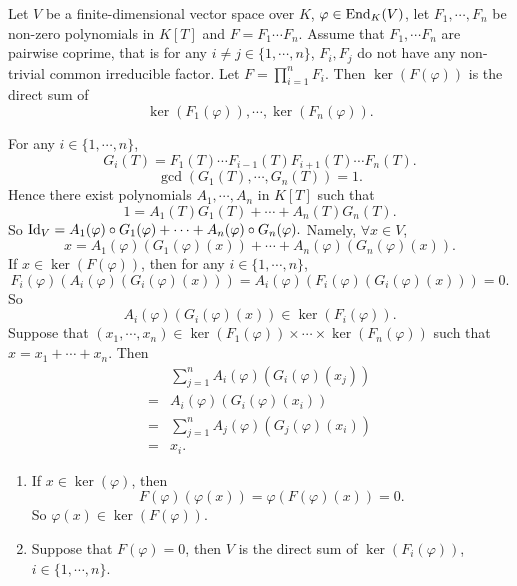 \begin{theoremenv}
    Let $V$ be a finite-dimensional vector space over $K$,
    $\varphi \in \operatorname{\mathrm{End}}_{K}(V)$,
    let $F_1,\cdots,F_n$ be non-zero polynomials in $K[T]$ and $F = F_1 \cdots F_n$.
    Assume that $F_1,\cdots F_n$ are pairwise coprime,
    that is for any $i \neq j \in \{1,\cdots,n\}$, $F_i,F_j$ do not have any non-trivial common irreducible factor.
    Let $F = \prod_{i=1}^{n} F_i$.
    Then $\ker(F(\varphi))$ is the direct sum of
    $$\ker(F_1(\varphi)), \cdots , \ker(F_n(\varphi)).$$
\end{theoremenv}
\begin{proofenv}
    For any $i \in \{1,\cdots,n\}$,
    $$G_{i}(T) = F_1(T) \cdots F_{i-1}(T) F_{i+1}(T) \cdots F_n(T).$$
    $$\gcd(G_{1}(T), \cdots, G_{n}(T)) = 1.$$
    Hence there exist polynomials $A_1,\cdots,A_n$ in $K[T]$ such that
    $$1 = A_1(T) G_1(T) + \cdots + A_n(T)G_n(T).$$
    So $\operatorname{\mathrm{Id}}_{V} = A_1(\varphi) \circ G_{1}(\varphi) + \cdots + A_n(\varphi) \circ G_{n}(\varphi).$
    Namely, $\forall x \in V$,
    $$x = A_1(\varphi) \left(G_1(\varphi)(x)\right) + \cdots + A_n(\varphi) \left(G_n(\varphi)(x)\right).$$
    If $x \in \ker\left(F(\varphi)\right)$,
    then for any $i \in \{1,\cdots,n\}$, 
    $$F_{i}(\varphi)\left(A_{i}(\varphi)\left(G_i(\varphi)(x)\right)\right) = A_i(\varphi)\left(F_i(\varphi)\left(G_i(\varphi)(x)\right)\right) = 0.$$
    So
    $$A_i(\varphi)\left(G_{i}(\varphi)(x)\right) \in \ker\left(F_{i}(\varphi)\right).$$
    Suppose that $(x_1,\cdots,x_n)\in \ker(F_1(\varphi)) \times \cdots \times \ker(F_{n}(\varphi))$ such that $x = x_1 + \cdots + x_n$.
    Then
    $$\begin{aligned}
        & \sum_{j=1}^{n}A_i(\varphi)\left(G_i(\varphi)(x_j)\right)\\
        = & A_i(\varphi)\left(G_i(\varphi)(x_i)\right)\\
        = & \sum_{j=1}^{n} A_{j}(\varphi)\left(G_j(\varphi)(x_i)\right)\\
        =& x_i.
    \end{aligned}$$
\end{proofenv}

\begin{remark}
    \quad
    \begin{enumerate}
        \item If $x \in \ker(\varphi)$, then
            $$F(\varphi)\left(\varphi(x)\right) = \varphi\left(F(\varphi)(x)\right) = 0.$$
            So $\varphi (x) \in \ker(F(\varphi))$.
        \item Suppose that $F(\varphi) = 0$,
            then $V$ is the direct sum of $\ker(F_i(\varphi))$, $i \in \{1,\cdots,n\}$.
    \end{enumerate}
\end{remark}

